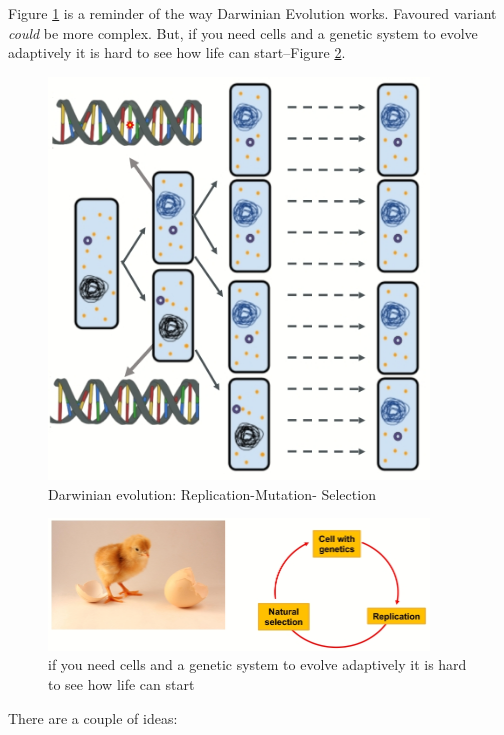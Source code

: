 \documentclass[]{article}
\begin{document}
Figure \ref{fig:ReplicationMutationSelection} is a reminder of the way Darwinian Evolution works. Favoured variant \textit{could} be more complex. But, if you need cells and a genetic system to evolve adaptively it is hard to see how life can start--Figure \ref{fig:ChickenEgg}.
\begin{figure}[H]
	\caption{Darwinian evolution: Replication-Mutation- Selection}\label{fig:ReplicationMutationSelection}
	\includegraphics[width=0.9\textwidth]{ReplicationMutationSelection}
\end{figure}

\begin{figure}[H]
	\caption{if you need cells and a genetic system to evolve adaptively it is hard to see how life can start}\label{fig:ChickenEgg}
	\includegraphics[width=0.9\textwidth]{ChickenEgg}
\end{figure}

There are a couple of ideas:
\end{document}
